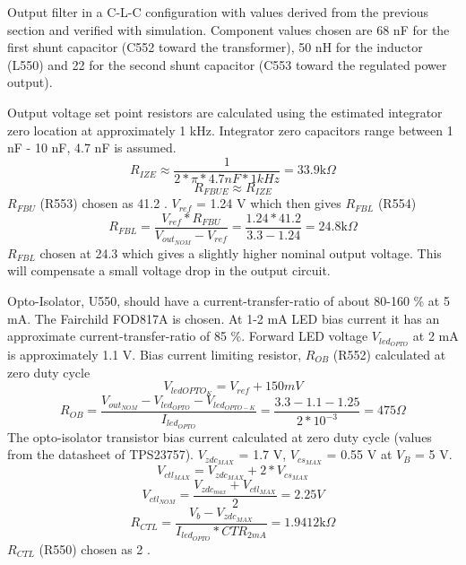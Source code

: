 Output filter in a C-L-C configuration with values derived from the
previous section and verified with simulation. Component values chosen
are 68 nF for the first shunt capacitor (C552 toward the transformer), 50
nH for the inductor (L550) and 22  for the second shunt
capacitor (C553 toward the regulated power output).


Output voltage set point resistors are calculated using the estimated
integrator zero location at approximately 1 kHz. Integrator zero
capacitors range between 1 nF - 10 nF, 4.7 nF is assumed.
\begin{equation}
R_{IZE} \approx \frac{1}{2* \pi * 4.7 nF * 1 kHz} =
33.9 \text{k$\Omega$}
\end{equation}
\begin{equation}
R_{FBUE} \approx R_{IZE}
\end{equation}
$R_{FBU}$ (R553) chosen as 41.2 . $V_{ref}$ = 1.24 V
which then gives $R_{FBL}$ (R554)
\begin{equation}
R_{FBL} = \frac{V_{ref}*R_{FBU}}{V_{out_{NOM}} - V_{ref}}
= \frac{1.24*41.2}{3.3-1.24} = 24.8 \text{k$\Omega$}
\end{equation}
$R_{FBL}$ chosen at 24.3  which gives a slightly
higher nominal output voltage. This will compensate a small voltage drop
in the output circuit.

Opto-Isolator, U550, should have a current-transfer-ratio of about
80-160 \% at 5 mA. The Fairchild FOD817A is chosen. At 1-2 mA LED bias
current it has an approximate current-transfer-ratio of 85 \%. Forward
LED voltage $V_{led_{OPTO}}$ at 2 mA is approximately 1.1 V. Bias
current limiting resistor, $R_{OB}$ (R552) calculated at zero duty
cycle
\begin{equation}
V_{led{OPTO_K}} = V_{ref} + 150 mV
\end{equation}
\begin{equation}
R_{OB} = \frac{V_{out_{NOM}} - V_{led_{OPTO}} -
V_{led_{OPTO-K}}}{I_{led_{OPTO}}} = \frac{3.3 - 1.1 - 1.25}{2*10^{-3}}
= 475 \Omega
\end{equation}
The opto-isolator transistor bias current calculated at zero duty
cycle (values from the datasheet of TPS23757). $V_{zdc_{MAX}}$ = 1.7
V, $V_{cs_{MAX}}$ = 0.55 V at $V_B$ = 5 V.
\begin{equation}
V_{ctl_{MAX}} = V_{zdc_{MAX}} + 2*V_{cs_{MAX}}
\end{equation}
\begin{equation}
V_{ctl_{NOM}} = \frac{V_{zdc_{max}} + V_{ctl_{MAX}}}{2} = 2.25 V
\end{equation}
\begin{equation}
R_{CTL} = \frac{V_b - V_{zdc_{MAX}}}{I_{led_{OPTO}}*CTR_{2mA}} =
1.9412 \text{k$\Omega$}
\end{equation}
$R_{CTL}$ (R550) chosen as 2 .

